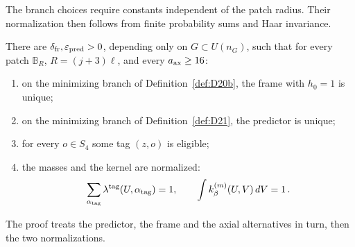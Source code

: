 The branch choices require constants independent of the patch radius. Their normalization then follows from finite probability sums and Haar invariance.
\begin{lemma}\label{lem:B1}
There are $\delta_{\rm fr},\varepsilon_{\rm pred}>0$, depending only on $G\subset U(n_G)$, such that for every patch $\mathbb B_R$, $R=(j+3)\ell$, and every $a_{\rm ax}\ge16$:
\begin{enumerate}[label=(\roman*)]
\item on the minimizing branch of Definition~\ref{def:D20b}, the frame with $h_0=1$ is unique;
\item on the minimizing branch of Definition~\ref{def:D21}, the predictor is unique;
\item for every $o\in S_4$ some tag $(z,o)$ is eligible;
\item the masses and the kernel are normalized:
\begin{equation*}
\sum_{\alpha_{\rm tag}}\lambda^{\rm tag}(U,\alpha_{\rm tag})=1,
\qquad\int k^{(m)}_\beta(U,V)\,dV=1\,.
\end{equation*}
\end{enumerate}
\end{lemma}
The proof treats the predictor, the frame and the axial alternatives in turn, then the two normalizations.
